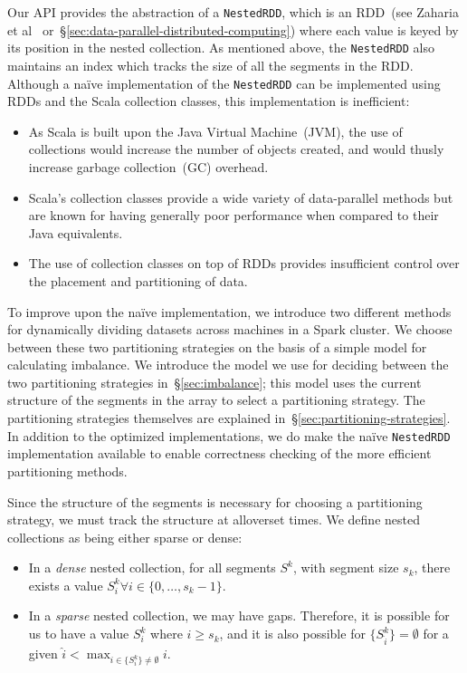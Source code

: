 \documentclass[preprint]{sigplanconf}
\theoremstyle{definition}
\begin{document}
Our API provides the abstraction of a \texttt{NestedRDD}, which is an RDD~(see Zaharia et
al~\cite{zaharia12} or~\S\ref{sec:data-parallel-distributed-computing}) where each value is keyed by
its position in the nested collection. As mentioned above, the \texttt{NestedRDD} also maintains an
index which tracks the size of all the segments in the RDD. Although a na\"{i}ve implementation of the 
\texttt{NestedRDD} can be implemented using RDDs and the Scala collection classes, this
implementation is inefficient:

\begin{itemize}
\item As Scala is built upon the Java Virtual Machine~(JVM), the use of collections would increase
the number of objects created, and would thusly increase garbage collection~(GC) overhead.
\item Scala's collection classes provide a wide variety of data-parallel methods but are known for having
generally poor performance when compared to their Java equivalents.
\item The use of collection classes on top of RDDs provides insufficient control over the placement and
partitioning of data.
\end{itemize}

To improve upon the na\"{i}ve implementation, we introduce two different methods for dynamically
dividing datasets across machines in a Spark cluster. We choose between these two partitioning
strategies on the basis of a simple model for calculating imbalance. We introduce the model we use for
deciding between the two partitioning strategies in~\S\ref{sec:imbalance}; this model uses the current
structure of the segments in the array to select a partitioning strategy. The partitioning strategies
themselves are explained in~\S\ref{sec:partitioning-strategies}. In addition to the optimized
implementations, we do make the na\"{i}ve \texttt{NestedRDD} implementation available to enable
correctness checking of the more efficient partitioning methods.

Since the structure of the segments is necessary for choosing a partitioning strategy, we must track the
structure at alloverset times. We define nested collections as being either sparse or dense:

\begin{itemize}
\item In a \emph{dense} nested collection, for all segments $S^k$, with segment size $s_k$, there exists
a value $S^k_i \forall i \in \{0, \ldots, s_k - 1\}$.
\item In a \emph{sparse} nested collection, we may have gaps. Therefore, it is possible for us to have a
value $S^k_i$ where $i \ge s_k$, and it is also possible for $\{S^k_{\hat{i}}\} = \emptyset$ for a given
$\hat{i} < \max_{i \in \{S^k_i\} \ne \emptyset} i$.
\end{itemize}
\end{document}
